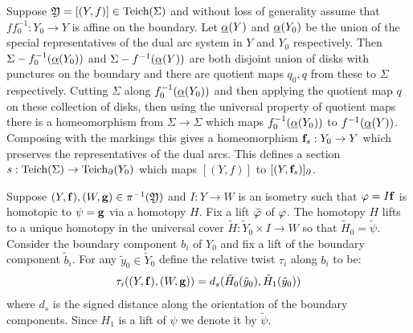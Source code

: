 Suppose $ \mathfrak{Y} = [(Y,f)]\in \text{Teich}(\Sigma)$ and without loss of generality assume that $ff_0^{-1}:Y_0\to Y$ is affine on the boundary. Let $\underline{\alpha}(Y)$ and $\underline{\alpha}(Y_0)$ be the union of the special representatives of the dual arc system in $Y$ and $Y_0$ respectively. Then $\Sigma - f_0^{-1}(\underline{\alpha}(Y_0))$ and $\Sigma - f^{-1}(\underline{\alpha}(Y))$ are both disjoint union of disks with punctures on the boundary and there are quotient maps $q_0,q$ from these to $\Sigma$ respectively. Cutting $\Sigma$ along $f_0^{-1}(\underline{\alpha}(Y_0))$ and then applying the quotient map $q$ on these collection of disks, then using the universal property of quotient maps there is a homeomorphism from $\Sigma\to \Sigma$ which maps $f_0^{-1}(\underline{\alpha}(Y_0))$ to $f^{-1}(\underline{\alpha}(Y))$. Composing with the markings this gives a homeomorphism $\mathbf{f}_s:Y_0\to Y$ which preserves the representatives of the dual arcs. This defines a section $s:\text{Teich}(\Sigma) \to \text{Teich}_\partial(Y_0)$ which maps $[(Y,f)]$ to $[(Y,\mathbf{f}_s)]_\partial$.
\begin{definition}
  Suppose $(Y,\mathbf{f}), (W,\mathbf{g})\in \pi^{-1}(\mathfrak{Y})$ and $I:Y\to W$ is an isometry such that $\varphi = I\mathbf{f}$ is homotopic to $\psi = \mathbf{g}$ via a homotopy $H$. Fix a lift $\tilde{\varphi}$ of $\varphi$. The homotopy $H$ lifts to a unique homotopy in the universal cover $\tilde{H}:\tilde{Y}_0\times I\to W$ so that $\tilde{H}_0 = \tilde{\psi}$. Consider the boundary component $b_i$ of $Y_0$ and fix a lift of the boundary component $\tilde{b}_i$. For any $\tilde{y}_0\in \tilde{Y}_0$ define the relative twist $\tau_i$ along $b_i$ to be:
  \begin{align}
    \tau_i((Y,\mathbf{f}), (W,\mathbf{g})) = d_s(\tilde{H}_0(\tilde{y}_0), \tilde{H}_1(\tilde{y}_0))
  \end{align}
  where $d_s$ is the signed distance along the orientation of the boundary components. Since $H_1$ is a lift of $\psi$ we denote it by $\tilde{\psi}$.
\end{definition}

